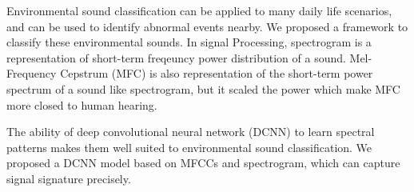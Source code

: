 Environmental sound classification can be applied to many daily life scenarios, and can be used to identify abnormal events nearby. We proposed a framework to classify these environmental sounds.
In signal Processing, spectrogram is a representation of short-term freqeuncy power distribution of a sound. 
Mel-Frequency Cepstrum (MFC) is also representation of the short-term power spectrum of a sound like spectrogram, but it scaled the power which make MFC more closed to human hearing. 
\begin{comment}
Mel-frequency cepstral coefficients (MFCCs) are coefficients that collectively make up an MFC.
MFCCs can usually be applied to extract sound features.
\end{comment}
The ability of deep convolutional neural network (DCNN) to learn spectral patterns makes them well suited to environmental sound classification. We proposed a DCNN model based on MFCCs and spectrogram, which can capture signal signature precisely.
